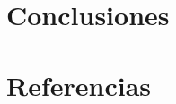 \documentclass{article}
\begin{document}
\newpage
\part*{Conclusiones}

\newpage
\part*{Referencias}
\lipsum{}
\label{LastPage}    
\end{document}
